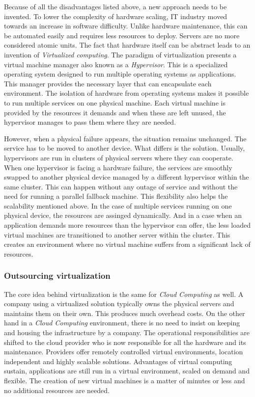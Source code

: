 Because of all the disadvantages listed above, a new approach needs to be invented. To lower the complexity of hardware scaling, IT industry moved towards an increase in software difficulty. Unlike hardware maintenance, this can be automated easily and requires less resources to deploy. Servers are no more considered atomic units. The fact that hardware itself can be abstract leads to an invention of \emph{Virtualized computing}. The paradigm of virtualization presents a virtual machine manager also known as a \emph{Hypervisor}. This is a specialized operating system designed to run multiple operating systems as applications. This manager provides the necessary layer that can encapsulate each environment. The isolation of hardware from operating systems makes it possible to run multiple services on one physical machine. Each virtual machine is provided by the resources it demands and when these are left unused, the hypervisor manages to pass them where they are needed.

However, when a physical failure appears, the situation remains unchanged. The service has to be moved to another device. What differs is the solution. Usually, hypervisors are run in clusters of physical servers where they can cooperate. When one hypervisor is facing a hardware failure, the services are smoothly swapped to another physical device managed by a different hypervisor within the same cluster. This can happen without any outage of service and without the need for running a parallel fallback machine. This flexibility also helps the scalability mentioned above. In the case of multiple services running on one physical device, the resources are assinged dynamically. And in a case when an application demands more resources than the hypervisor can offer, the less loaded virtual machines are transitioned to another server within the cluster. This creates an environment where no virtual machine suffers from a significant lack of resources.

\subsubsection{Outsourcing virtualization}
\label{subs:Outsourcing virtualization}

The core idea behind virtualization is the same for \emph{Cloud Computing} as well. A company using a virtualized solution typically owns the physical servers and maintains them on their own. This produces much overhead costs. On the other hand in a \emph{Cloud Computing} environment, there is no need to insist on keeping and housing the infrastructure by a company. The operational responsibilities are shifted to the cloud provider who is now responsible for all the hardware and its maintenance. Providers offer remotely controlled virtual environments, location independent and highly scalable solutions. Advantages of virtual computing sustain, applications are still run in a virtual environment, scaled on demand and flexible. The creation of new virtual machines is a matter of minutes or less and no additional resources are needed\cite{aws}.


